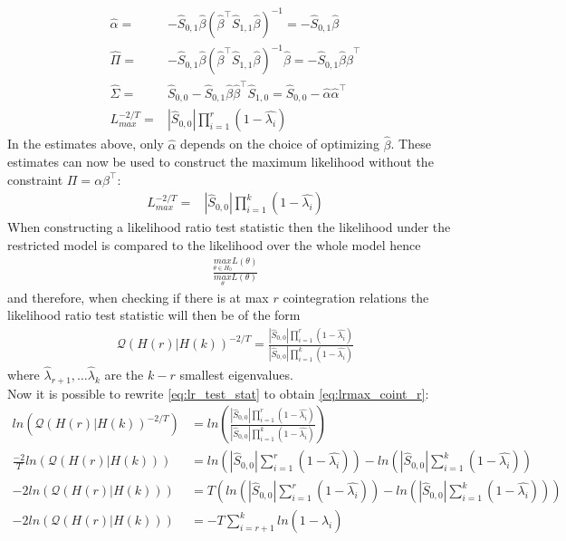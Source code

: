 \begin{bevis}
\begin{align*}
    \hat{\alpha}=&-\hat{S}_{0,1}\hat{\beta}(\hat{\beta}^\top \hat{S}_{1,1}\hat{\beta})^{-1}=-\hat{S}_{0,1}\hat{\beta}\\
    \hat{\Pi}=&-\hat{S}_{0,1}\hat{\beta}(\hat{\beta}^\top \hat{S}_{1,1}\hat{\beta})^{-1}\hat{\beta}=-\hat{S}_{0,1}\hat{\beta}\hat{\beta}^\top\\
    \hat{\Sigma}=&\hat{S}_{0,0}-\hat{S}_{0,1}\hat{\beta}\hat{\beta}^\top\hat{S}_{1,0}=\hat{S}_{0,0}-\hat{\alpha}\hat{\alpha}^\top\\
    L_{max}^{-2/T}=&|\hat{S}_{0,0}|\prod_{i=1}^r(1-\hat{\lambda_i})
\end{align*}
In the estimates above, only $\hat{\alpha}$ depends on the choice of optimizing $\hat{\beta}$. These estimates can now be used to construct the maximum likelihood without the constraint $\Pi=\alpha\beta^{\top}$:
\begin{align*}
    L_{max}^{-2/T}=&|\hat{S}_{0,0}|\prod_{i=1}^k(1-\hat{\lambda_i})
\end{align*}
When constructing a likelihood ratio test statistic then the likelihood under the restricted model is compared to the likelihood over the whole model hence
\begin{align*}
    \frac{\underset{\theta\in H_0}{max}L(\theta)}{\underset{\theta}{max}L(\theta)}
\end{align*}
and therefore, when checking if there is at max $r$ cointegration relations the likelihood ratio test statistic will then be of the form
\begin{align}\label{eq:lr_test_stat}
\mathcal{Q}(H(r)|H(k))^{-2/T}=\frac{|\hat{S}_{0,0}|\prod_{i=1}^r (1-\hat{\lambda_i})}{|\hat{S}_{0,0}|\prod_{i=1}^k(1-\hat{\lambda_i})}
\end{align}
where $\hat{\lambda}_{r+1},\ldots\hat{\lambda}_k$ are the $k-r$ smallest eigenvalues.\\
Now it is possible to rewrite \eqref{eq:lr_test_stat} to obtain \eqref{eq:lrmax_coint_r}:
\begin{align*}
ln\left(\mathcal{Q}(H(r)|H(k))^{-2/T}\right)&=ln\left(\frac{|\hat{S}_{0,0}|\prod_{i=1}^r (1-\hat{\lambda_i})}{|\hat{S}_{0,0}|\prod_{i=1}^k(1-\hat{\lambda_i})}\right)\\
    \frac{-2}{T}ln\left(\mathcal{Q}(H(r)|H(k))\right)&=ln\left(|\hat{S}_{0,0}| \sum_{i=1}^r (1-\hat{\lambda_i})\right)-ln\left(|\hat{S}_{0,0}|\sum_{i=1}^k (1-\hat{\lambda_i})\right)\\
    -2ln\left(\mathcal{Q}(H(r)|H(k))\right)&=T\left( ln\left(|\hat{S}_{0,0}| \sum_{i=1}^r (1-\hat{\lambda_i})\right)-ln\left(|\hat{S}_{0,0}|\sum_{i=1}^k (1-\hat{\lambda_i})\right)\right)\\
    -2ln\left(\mathcal{Q}(H(r)|H(k))\right)&=-T\sum_{i=r+1}^kln(1-\hat{\lambda}_i)
\end{align*}
\end{bevis} 




